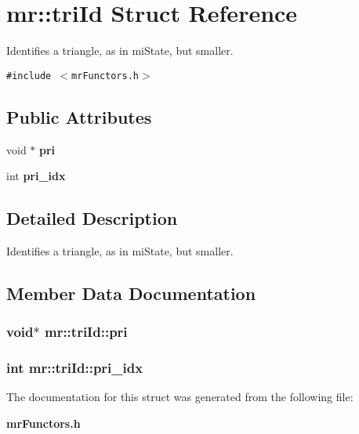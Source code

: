 \section{mr::tri\-Id Struct Reference}
\label{structmr_1_1triId}
Identifies a triangle, as in mi\-State, but smaller.  


{\tt \#include $<$mr\-Functors.h$>$}

\subsection*{Public Attributes}
\begin{CompactItemize}
\item 
void $\ast$ {\bf pri}
\item 
int {\bf pri\_\-idx}
\end{CompactItemize}


\subsection{Detailed Description}
Identifies a triangle, as in mi\-State, but smaller. 



\subsection{Member Data Documentation}
\subsubsection{\setlength{\rightskip}{0pt plus 5cm}void$\ast$ {\bf mr::tri\-Id::pri}}\label{structmr_1_1triId_o0}


\subsubsection{\setlength{\rightskip}{0pt plus 5cm}int {\bf mr::tri\-Id::pri\_\-idx}}\label{structmr_1_1triId_o1}




The documentation for this struct was generated from the following file:\begin{CompactItemize}
\item 
{\bf mr\-Functors.h}\end{CompactItemize}
